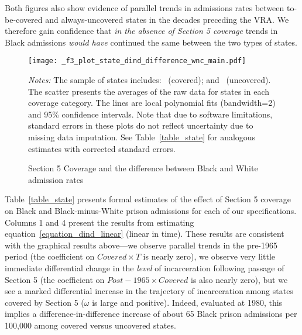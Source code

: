\documentclass[12pt]{article}
\begin{document}
Both figures also show evidence of parallel trends in admissions rates between to-be-covered and always-uncovered states in the decades preceding the VRA.  We therefore gain confidence that \emph{in the absence of Section 5 coverage} trends in Black admissions \emph{would have} continued the same between the two types of states.




\begin{figure}[t!]
	\begin{center}
	\caption{Section 5 Coverage and the difference between Black and White admission rates}
		\small \vspace*{.05in}
		\smallskip
				\texttt{[image: \_f3\_plot\_state\_dind\_difference\_wnc\_main.pdf]}
		\label{figure_state_difference}
		\end{center}
	\scriptsize{\emph{Notes:} The sample of states includes: \unskip~(covered); and \unskip~(uncovered).  The scatter presents the averages of the raw data for states in each coverage category.  The lines are local polynomial fits (bandwidth=2) and 95\% confidence intervals. Note that due to software limitations, standard errors in these plots do not reflect uncertainty due to missing data imputation. See Table~\ref{table_state} for analogous estimates with corrected standard errors.}
\end{figure} \normalsize



Table~\ref{table_state} presents formal estimates of the effect of Section 5 coverage on Black and Black-minus-White prison admissions for each of our specifications.  Columns 1 and 4 present the results from estimating equation~\ref{equation_dind_linear} (linear in time). These results are consistent with the graphical results above---we observe parallel trends in the pre-1965 period (the coefficient on $Covered \times T$ is nearly zero), we observe very little immediate differential change in the \emph{level} of incarceration following passage of Section 5 (the coefficient on $Post-1965 \times Covered$ is also nearly zero), but we see a marked differential increase in the trajectory of incarceration among states covered by Section 5 ($\omega$ is large and positive). Indeed, evaluated at 1980, this implies a difference-in-difference increase of about 65 Black prison admissions per 100,000 among covered versus uncovered states.
\end{document}
